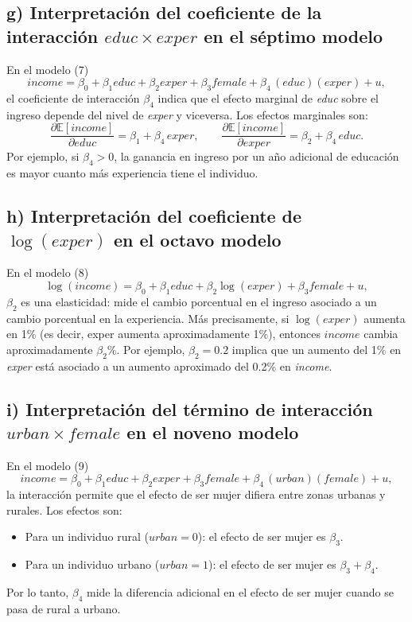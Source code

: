 \documentclass[12pt]{article}
\begin{document}
\subsection*{g) Interpretación del coeficiente de la interacción $educ\times exper$ en el séptimo modelo}
En el modelo (7)
\[
income = \beta_{0} + \beta_{1}educ + \beta_{2}exper + \beta_{3}female + \beta_{4}\,(educ)(exper) + u,
\]
el coeficiente de interacción $\beta_{4}$ indica que el efecto marginal de \textit{educ} sobre el ingreso depende del nivel de \textit{exper} y viceversa. Los efectos marginales son:
\[
\frac{\partial \mathbb{E}[income]}{\partial educ} = \beta_{1} + \beta_{4}\,exper,
\qquad
\frac{\partial \mathbb{E}[income]}{\partial exper} = \beta_{2} + \beta_{4}\,educ.
\]
Por ejemplo, si $\beta_{4}>0$, la ganancia en ingreso por un año adicional de educación es mayor cuanto más experiencia tiene el individuo.

\subsection*{h) Interpretación del coeficiente de $\log(exper)$ en el octavo modelo}
En el modelo (8)
\[
\log(income) = \beta_{0} + \beta_{1}educ + \beta_{2}\log(exper) + \beta_{3}female + u,
\]
$\beta_{2}$ es una elasticidad: mide el cambio porcentual en el ingreso asociado a un cambio porcentual en la experiencia. Más precisamente, si $\log(exper)$ aumenta en 1\% (es decir, exper aumenta aproximadamente 1\%), entonces $income$ cambia aproximadamente $\beta_{2}\%$. Por ejemplo, $\beta_{2}=0.2$ implica que un aumento del 1\% en \textit{exper} está asociado a un aumento aproximado del 0.2\% en \textit{income}.

\subsection*{i) Interpretación del término de interacción $urban\times female$ en el noveno modelo}
En el modelo (9)
\[
income = \beta_{0} + \beta_{1}educ + \beta_{2}exper + \beta_{3}female + \beta_{4}\,(urban)(female) + u,
\]
la interacción permite que el efecto de ser mujer difiera entre zonas urbanas y rurales. Los efectos son:
\begin{itemize}
    \item Para un individuo rural (\(urban=0\)): el efecto de ser mujer es $\beta_{3}$.
    \item Para un individuo urbano (\(urban=1\)): el efecto de ser mujer es $\beta_{3} + \beta_{4}$.
\end{itemize}
Por lo tanto, $\beta_{4}$ mide la diferencia adicional en el efecto de ser mujer cuando se pasa de rural a urbano.
\end{document}
